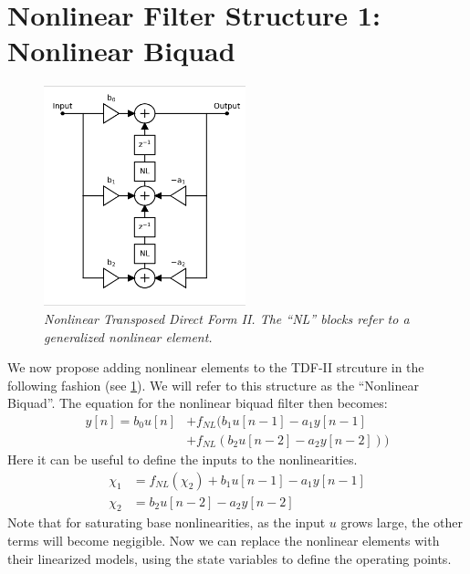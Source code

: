 \documentclass{IEEEtran}
\begin{document}
\section{Nonlinear Filter Structure 1: Nonlinear Biquad}
%
\begin{figure}[ht]
    \center
    \includegraphics[width=2.3in]{../Pics/NL-TDF-II-White.png}
    \caption{\label{NL-TDF-II}{\it Nonlinear Transposed Direct Form II.
                                The ``NL'' blocks refer to a generalized
                                nonlinear element.}}
\end{figure}
%
We now propose adding nonlinear elements to the TDF-II strcuture in the
following fashion (see \cref{NL-TDF-II}). We will refer to this structure
as the ``Nonlinear Biquad''.
%
The equation for the nonlinear biquad filter then becomes:
%
\begin{equation}
\begin{split}
    y[n] = b_0 u[n]
         &+ f_{NL} (b_1 u[n-1] - a_1 y[n-1] \\
         &+ f_{NL} (b_2 u[n-2] - a_2 y[n-2]))
\end{split}
    \label{eq:bq_NL}
\end{equation}
%
Here it can be useful to define the inputs to the
nonlinearities.
%
\begin{equation}
\begin{split}
    \chi_1 &= f_{NL} (\chi_2) + b_1 u[n-1] - a_1 y[n-1] \\
    \chi_2 &= b_2 u[n-2] - a_2 y[n-2]
\end{split}
    \label{eq:states}
\end{equation}
%
Note that for saturating base nonlinearities, as the input $u$ grows large,
the other terms will become negigible.
\newline\newline
Now we can replace the nonlinear elements with their linearized
models, using the state variables to define the operating points.
\end{document}
